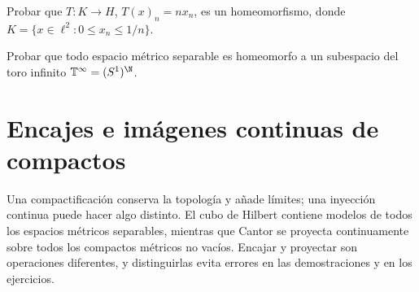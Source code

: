 \begin{ejercicio}\label{ej:lectura-16-4}
Probar que $T:K\to H$, $T(x)_n=nx_n$, es un homeomorfismo, donde $K=\{x\in\ell^2:0\le x_n\le1/n\}$.
\end{ejercicio}


\begin{ejercicio}\label{ej:lectura-16-5}
Probar que todo espacio métrico separable es homeomorfo a un subespacio del toro infinito $\mathbb T^\infty=(S^1)^{\N}$.
\end{ejercicio}


\section{Encajes e imágenes continuas de compactos}
Una compactificación conserva la topología y añade límites; una inyección continua puede hacer algo distinto. El cubo de Hilbert contiene modelos de todos los espacios métricos separables, mientras que Cantor se proyecta continuamente sobre todos los compactos métricos no vacíos. Encajar y proyectar son operaciones diferentes, y distinguirlas evita errores en las demostraciones y en los ejercicios.
